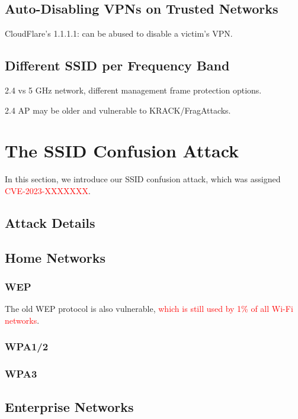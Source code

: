 \documentclass[sigconf,review]{acmart}
\newcommand{\wifi}{\mbox{Wi-Fi}}
\DeclareRobustCommand{\red}[1]{\textcolor{red}{#1}}
\begin{document}
\subsection{Auto-Disabling VPNs on Trusted Networks}

CloudFlare's 1.1.1.1: can be abused to disable a victim's VPN.

\subsection{Different SSID per Frequency Band}

2.4 vs 5 GHz network, different management frame protection options.

2.4 AP may be older and vulnerable to KRACK/FragAttacks.

\section{The SSID Confusion Attack}
\label{sec:attack}

In this section, we introduce our SSID confusion attack, which was assigned \red{CVE-2023-XXXXXXX}.

\subsection{Attack Details}



\subsection{Home Networks}

\subsubsection{WEP}
The old WEP protocol is also vulnerable, \red{which is still used by 1\% of all \wifi{} networks}.

\subsubsection{WPA1/2}

\subsubsection{WPA3}

\subsection{Enterprise Networks} %
\end{document}
